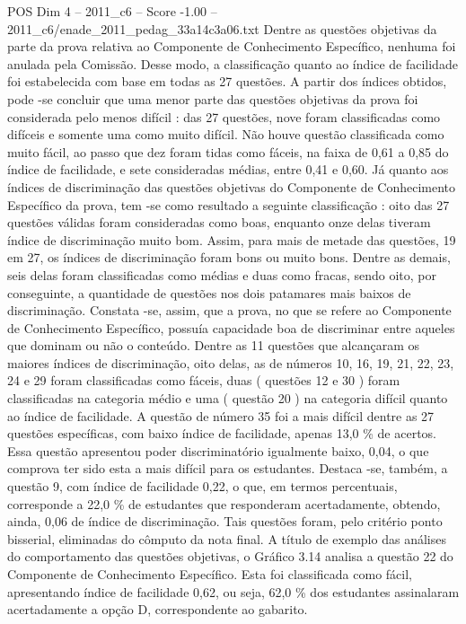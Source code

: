 \begin{textsample}{POS Dim 4 – 2011\_c6 – Score -1.00 – 2011\_c6/enade\_2011\_pedag\_33a14c3a06.txt}
Dentre as questões objetivas da parte da prova relativa ao Componente de Conhecimento Específico, nenhuma foi anulada pela Comissão.
Desse modo, a classificação quanto ao índice de facilidade foi estabelecida com base em todas as 27 questões.
A partir dos índices obtidos, pode -se concluir que uma menor parte das questões objetivas da prova foi considerada pelo menos difícil : das 27 questões, nove foram classificadas como difíceis e somente uma como muito difícil.
Não houve questão classificada como muito fácil, ao passo que dez foram tidas como fáceis, na faixa de 0,61 a 0,85 do índice de facilidade, e sete consideradas médias, entre 0,41 e 0,60.
Já quanto aos índices de discriminação das questões objetivas do Componente de Conhecimento Específico da prova, tem -se como resultado a seguinte classificação : oito das 27 questões válidas foram consideradas como boas, enquanto onze delas tiveram índice de discriminação muito bom.
Assim, para mais de metade das questões, 19 em 27, os índices de discriminação foram bons ou muito bons.
Dentre as demais, seis delas foram classificadas como médias e duas como fracas, sendo oito, por conseguinte, a quantidade de questões nos dois patamares mais baixos de discriminação.
Constata -se, assim, que a prova, no que se refere ao Componente de Conhecimento Específico, possuía capacidade boa de discriminar entre aqueles que dominam ou não o conteúdo.
Dentre as 11 questões que alcançaram os maiores índices de discriminação, oito delas, as de números 10, 16, 19, 21, 22, 23, 24 e 29 foram classificadas como fáceis, duas ( questões 12 e 30 ) foram classificadas na categoria médio e uma ( questão 20 ) na categoria difícil quanto ao índice de facilidade.
A questão de número 35 foi a mais difícil dentre as 27 questões específicas, com baixo índice de facilidade, apenas 13,0 \% de acertos.
Essa questão apresentou poder discriminatório igualmente baixo, 0,04, o que comprova ter sido esta a mais difícil para os estudantes.
Destaca -se, também, a questão 9, com índice de facilidade 0,22, o que, em termos percentuais, corresponde a 22,0 \% de estudantes que responderam acertadamente, obtendo, ainda, 0,06 de índice de discriminação.
Tais questões foram, pelo critério ponto bisserial, eliminadas do cômputo da nota final.
A título de exemplo das análises do comportamento das questões objetivas, o Gráfico 3.14 analisa a questão 22 do Componente de Conhecimento Específico.
Esta foi classificada como fácil, apresentando índice de facilidade 0,62, ou seja, 62,0 \% dos estudantes assinalaram acertadamente a opção D, correspondente ao gabarito.

\end{textsample}

